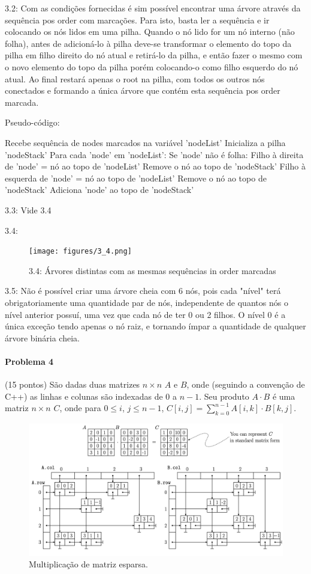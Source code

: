 \documentclass{article}
\begin{document}
3.2: Com as condições fornecidas é sim possível encontrar uma árvore através da sequência pos order com marcações. Para isto, basta ler a sequência e ir colocando os nós lidos em uma pilha. Quando o nó lido for um nó interno (não folha), antes de adicioná-lo à pilha deve-se transformar o elemento do topo da pilha em filho direito do nó atual e retirá-lo da pilha, e então fazer o mesmo com o novo elemento do topo da pilha porém colocando-o como filho esquerdo do nó atual. Ao final restará apenas o root na pilha, com todos os outros nós conectados e formando a única árvore que contém esta sequência pos order marcada.

Pseudo-código:

Recebe sequência de nodes marcados na variável 'nodeList'
Inicializa a pilha 'nodeStack'
Para cada 'node' em 'nodeList':
    Se 'node' não é folha:
        Filho à direita de 'node' = nó ao topo de 'nodeList'
        Remove o nó ao topo de 'nodeStack'
        Filho à esquerda de 'node' = nó ao topo de 'nodeList'
        Remove o nó ao topo de 'nodeStack'
    Adiciona 'node' ao topo de 'nodeStack'

3.3: Vide 3.4

3.4:

\begin{figure}[!h]
  \centering  
    \texttt{[image: figures/3\_4.png]}
  \caption{3.4: Árvores distintas com as mesmas sequências in order marcadas}
  \label{fig:matrix}
\end{figure}

3.5: Não é possível criar uma árvore cheia com 6 nós, pois cada "nível" terá obrigatoriamente uma quantidade par de nós, independente de quantos nós o nível anterior possuí, uma vez que cada nó de ter 0 ou 2 filhos. O nível 0 é a única exceção tendo apenas o nó raiz, e tornando ímpar a quantidade de qualquer árvore binária cheia.

\paragraph{Problema 4} (15 pontos) São dadas duas matrizes $n \times n$ $A$ e $B$, onde (seguindo a  convenção de C++) as linhas e colunas são indexadas de $0$ a $n-1$. Seu produto $A \cdot B$ é uma  matriz $n \times n$ $C$, onde para $0 \leq i$, $j \leq n-1$, $C[i,j]=\sum_{k=0}^{n-1}A[i,k]\cdot B[k,j]$.

\begin{figure}[!h]
  \centering  
    \includegraphics[width=.9\textwidth]{figures/matrix.png}
  \caption{Multiplicação de matriz esparsa.}
  \label{fig:matrix}
\end{figure}
\end{document}
